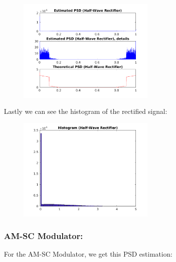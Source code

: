 \documentclass[a4paper,11pt]{article}
\begin{document}
\begin{figure}[!hp]
    \begin{center}
      \includegraphics[width=0.6\textwidth]{images/study3/comp_psd_hw.png}
    \end{center}
\end{figure}

Lastly we can see the histogram of the rectified signal:

\begin{figure}[!hp]
    \begin{center}
      \includegraphics[width=0.6\textwidth]{images/study3/hist_hw.png}
    \end{center}
\end{figure}

\newpage

\subsubsection{AM-SC Modulator:}

For the AM-SC Modulator, we get this PSD estimation:
\end{document}
